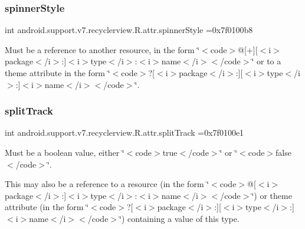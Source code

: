 \subsubsection{\texorpdfstring{spinner\+Style}{spinnerStyle}}
{\footnotesize\ttfamily int android.\+support.\+v7.\+recyclerview.\+R.\+attr.\+spinner\+Style =0x7f0100b8\hspace{0.3cm}{\ttfamily [static]}}

Must be a reference to another resource, in the form \char`\"{}$<$code$>$@\mbox{[}+\mbox{]}\mbox{[}$<$i$>$package$<$/i$>$\+:\mbox{]}$<$i$>$type$<$/i$>$\+:$<$i$>$name$<$/i$>$$<$/code$>$\char`\"{} or to a theme attribute in the form \char`\"{}$<$code$>$?\mbox{[}$<$i$>$package$<$/i$>$\+:\mbox{]}\mbox{[}$<$i$>$type$<$/i$>$\+:\mbox{]}$<$i$>$name$<$/i$>$$<$/code$>$\char`\"{}. \mbox{\label{classandroid_1_1support_1_1v7_1_1recyclerview_1_1R_1_1attr_ae655a2b7105f20b3c3188361fa22160c}} 
\subsubsection{\texorpdfstring{split\+Track}{splitTrack}}
{\footnotesize\ttfamily int android.\+support.\+v7.\+recyclerview.\+R.\+attr.\+split\+Track =0x7f0100e1\hspace{0.3cm}{\ttfamily [static]}}

Must be a boolean value, either \char`\"{}$<$code$>$true$<$/code$>$\char`\"{} or \char`\"{}$<$code$>$false$<$/code$>$\char`\"{}. 

This may also be a reference to a resource (in the form \char`\"{}$<$code$>$@\mbox{[}$<$i$>$package$<$/i$>$\+:\mbox{]}$<$i$>$type$<$/i$>$\+:$<$i$>$name$<$/i$>$$<$/code$>$\char`\"{}) or theme attribute (in the form \char`\"{}$<$code$>$?\mbox{[}$<$i$>$package$<$/i$>$\+:\mbox{]}\mbox{[}$<$i$>$type$<$/i$>$\+:\mbox{]}$<$i$>$name$<$/i$>$$<$/code$>$\char`\"{}) containing a value of this type. \mbox{\label{classandroid_1_1support_1_1v7_1_1recyclerview_1_1R_1_1attr_af04c5670ad28df7859bd00c6a3535d94}} 
